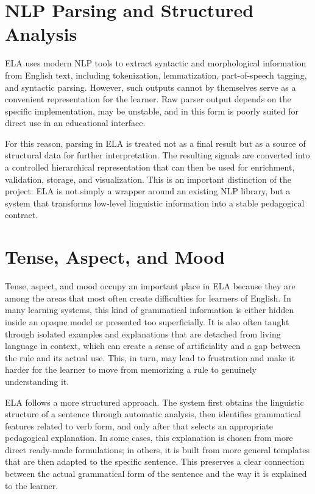 \documentclass[12pt,a4paper,oneside]{report}
\begin{document}
\section{NLP Parsing and Structured Analysis}
ELA uses modern NLP tools to extract syntactic and morphological information from English text, including tokenization, lemmatization, part-of-speech tagging, and syntactic parsing. However, such outputs cannot by themselves serve as a convenient representation for the learner. Raw parser output depends on the specific implementation, may be unstable, and in this form is poorly suited for direct use in an educational interface.

For this reason, parsing in ELA is treated not as a final result but as a source of structural data for further interpretation. The resulting signals are converted into a controlled hierarchical representation that can then be used for enrichment, validation, storage, and visualization. This is an important distinction of the project: ELA is not simply a wrapper around an existing NLP library, but a system that transforms low-level linguistic information into a stable pedagogical contract.

\section{Tense, Aspect, and Mood}
Tense, aspect, and mood occupy an important place in ELA because they are among the areas that most often create difficulties for learners of English. In many learning systems, this kind of grammatical information is either hidden inside an opaque model or presented too superficially. It is also often taught through isolated examples and explanations that are detached from living language in context, which can create a sense of artificiality and a gap between the rule and its actual use. This, in turn, may lead to frustration and make it harder for the learner to move from memorizing a rule to genuinely understanding it.

ELA follows a more structured approach. The system first obtains the linguistic structure of a sentence through automatic analysis, then identifies grammatical features related to verb form, and only after that selects an appropriate pedagogical explanation. In some cases, this explanation is chosen from more direct ready-made formulations; in others, it is built from more general templates that are then adapted to the specific sentence. This preserves a clear connection between the actual grammatical form of the sentence and the way it is explained to the learner.
\end{document}
